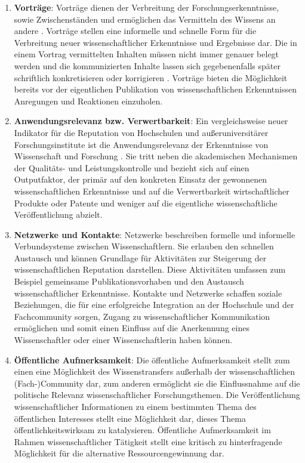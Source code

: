 \begin{enumerate}
\item \textbf{Vorträge}: Vorträge dienen der Verbreitung der Forschungserkenntnisse, sowie Zwischenständen und ermöglichen das Vermitteln des Wissens an andere \cite{Rassenhoevel_2010}. Vorträge stellen eine informelle und schnelle Form für die Verbreitung neuer wissenschaftlicher Erkenntnisse und Ergebnisse dar. Die in einem Vortrag vermittelten Inhalten müssen nicht immer genauer belegt werden und die kommunizierten Inhalte lassen sich gegebenenfalls später schriftlich konkretisieren oder korrigieren \cite{Haberle_2002}. Vorträge bieten die Möglichkeit bereits vor der eigentlichen Publikation von wissenschaftlichen Erkenntnissen Anregungen und Reaktionen einzuholen.
\item\textbf{Anwendungsrelevanz bzw. Verwertbarkeit}: Ein vergleichsweise neuer Indikator für die Reputation von Hochschulen und außeruniversitärer Forschungsinstitute ist die Anwendungsrelevanz der Erkenntnisse von Wissenschaft und Forschung \cite{Simon_2009}. Sie tritt
neben die akademischen Mechanismen der Qualitäts- und Leistungskontrolle \cite[:8]{Buss_2001} und bezieht sich auf einen Outputfaktor, der primär auf den konkreten Einsatz der gewonnenen wissenschaftlichen Erkenntnisse und auf die Verwertbarkeit wirtschaftlicher Produkte oder Patente und weniger auf die eigentliche wissenschaftliche Veröffentlichung abzielt.
\item \textbf{Netzwerke und Kontakte}: Netzwerke beschreiben formelle und informelle Verbundsysteme zwischen Wissenschaftlern. Sie erlauben den schnellen Austausch und können Grundlage für Aktivitäten zur Steigerung der wissenschaftlichen Reputation darstellen. Diese Aktivitäten umfassen zum Beispiel gemeinsame Publikationsvorhaben und den Austausch wissenschaftlicher Erkenntnisse. Kontakte und Netzwerke schaffen soziale Beziehungen, die für eine erfolgreiche Integration an der Hochschule und der Fachcommunity sorgen, Zugang zu wissenschaftlicher Kommunikation ermöglichen und somit einen Einfluss auf die Anerkennung eines Wissenschaftler oder einer Wissenschaftlerin haben können.
\item \textbf{Öffentliche Aufmerksamkeit}: Die öffentliche Aufmerksamkeit stellt zum einen eine Möglichkeit des Wissenstransfers außerhalb der wissenschaftlichen (Fach-)Community dar, zum anderen ermöglicht sie die Einflussnahme auf die politische Relevanz wissenschaftlicher Forschungsthemen. Die Veröffentlichung wissenschaftlicher Informationen zu einem bestimmten Thema des öffentlichen Interesses stellt eine Möglichkeit dar, dieses Thema öffentlichkeitswirksam zu katalysieren. Öffentliche Aufmerksamkeit im Rahmen wissenschaftlicher Tätigkeit stellt eine kritisch zu hinterfragende Möglichkeit für die alternative Ressourcengewinnung dar.

\end{enumerate}
